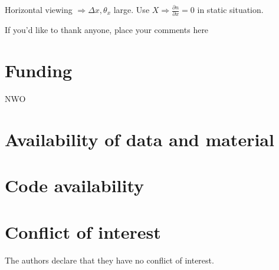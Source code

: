 \documentclass[draft]{svjour3}                     %
\begin{document}
Horizontal viewing $\Rightarrow \Delta x, \theta_x$ large. Use $X \Rightarrow \frac{\partial n}{\partial x} = 0$ in static situation.
\begin{acknowledgements}
If you'd like to thank anyone, place your comments here
\end{acknowledgements}

\section*{Funding}
NWO

\section*{Availability of data and material}

\section*{Code availability}

%
 \section*{Conflict of interest}
 The authors declare that they have no conflict of interest.

\printbibliography[heading=bibintoc]

%
%
\end{document}
